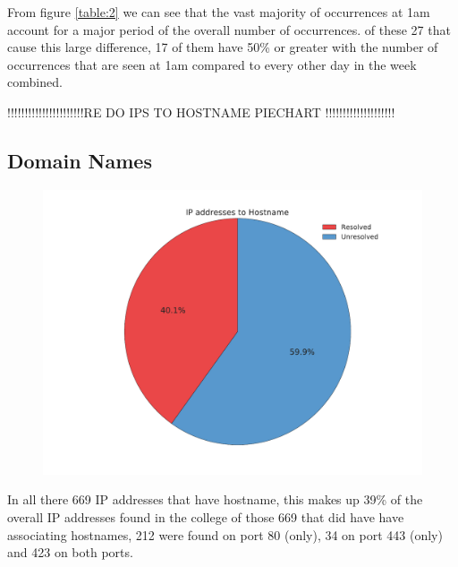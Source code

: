 \documentclass[a4wide,leqno,12pt]{report}
\begin{document}
From figure \ref{table:2} we can see that the vast majority of occurrences at 1am account for a major period of the overall number of occurrences. of these 27 that cause this large difference, 17 of them have 50\% or greater with the number of occurrences that are seen at 1am compared to every other day in the week combined.
 

!!!!!!!!!!!!!!!!!!!!!!RE DO IPS TO HOSTNAME PIECHART !!!!!!!!!!!!!!!!!!!!
\subsection{Domain Names}
\begin{figure}[H]
\centering
\includegraphics[scale=.5]{pdf_images/IpstoHostname}

\end{figure}

In all there 669 IP addresses that have hostname, this makes up 39\% of the overall IP addresses found in the college of those 669 that did have have associating hostnames, 212 were found on port 80 (only), 34 on port 443 (only) and 423 on both ports.
\end{document}

